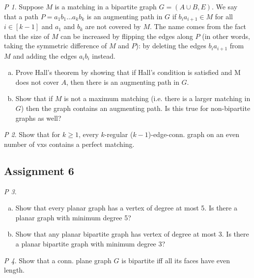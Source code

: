 \documentclass[11pt, fleqn, a4paper, landscape]{article}
\theoremstyle{plain} %
\theoremstyle{remark} %
\newtheorem{problem}{P}
\theoremstyle{definition} %
\begin{document}
\begin{multicols}{5}
\begin{problem}
Suppose $M$ is a matching in a bipartite graph $G = (A\cup B,E)$. We say that a path $P = a_1b_1\dots a_kb_k$ is an augmenting path in $G$ if $b_ia_{i+1}\in M$ for all $i\in [k - 1]$ and $a_1$ and $b_k$ are not covered by $M$. The name comes from the fact that the size of $M$ can be increased
by 
flipping the edges along $P$ (in other words, taking the symmetric difference of $M$ and $P$): by deleting the edges $b_ia_{i+1}$ from $M$ and adding the edges $a_ib_i$ instead.
\begin{enumerate}[(a)]
\item Prove Hall's theorem by showing that if Hall's condition is satisfied and M does not cover $A$, then there is an augmenting path in $G$.
\item Show that if $M$ is not a maximum matching (i.e. there is a larger matching in $G$) then the graph contains an augmenting path. Is this true for non-bipartite graphs as well?
\end{enumerate}
\end{problem}

\begin{problem}
Show that for $k\ge 1$, every $k$-regular ($k- 1$)-edge-conn. graph on an even number of vxs contains a perfect matching.
\end{problem}

\subsection{Assignment 6}

\addtocounter{problem}{1}

\begin{problem}
\begin{enumerate}[(a)]
\item Show that every planar graph has a vertex of degree at most 5. Is there a planar graph with minimum degree 5?
\item Show that any planar bipartite graph has vertex of degree at most 3. Is there a planar bipartite graph with minimum degree 3?
\end{enumerate}
\end{problem}

\begin{problem}
Show that a conn. plane graph $G$ is bipartite iff all its faces have even length.
\end{problem}


\end{multicols}
\end{document}
